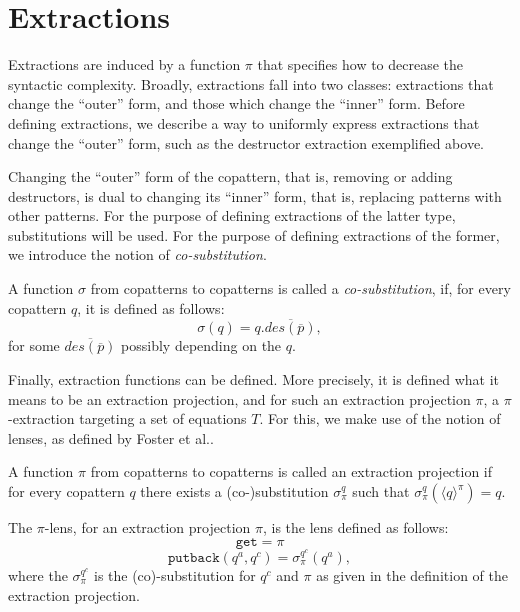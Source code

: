 \section{Extractions}
\label{sec:extrdef}

Extractions are induced by a function $\pi$ that specifies how to decrease the syntactic complexity. Broadly, extractions fall into two classes: extractions that change the ``outer'' form, and those which change the ``inner'' form. Before defining extractions, we describe a way to uniformly express extractions that change the ``outer'' form, such as the destructor extraction exemplified above.

Changing the ``outer'' form of the copattern, that is, removing or adding destructors, is dual to changing its ``inner'' form, that is, replacing patterns with other patterns. For the purpose of defining extractions of the latter type, substitutions will be used. For the purpose of defining extractions of the former, we introduce the notion of \textit{co-substitution}.

\begin{definition}[Co-substitution]
A function $\sigma$ from copatterns to copatterns is called a \textit{co-substitution}, if, for every copattern $q$, it is defined as follows:
\[
\sigma(q) = q.\overline{des(\overline{p})},
\]
for some $\overline{des(\overline{p})}$ possibly depending on the $q$.
\end{definition}

Finally, extraction functions can be defined. More precisely, it is defined what it means to be an extraction projection, and for such an extraction projection $\pi$, a $\pi$-extraction targeting a set of equations $T$. For this, we make use of the notion of lenses, as defined by Foster et al.\cite{foster05combinators}.

\begin{definition}
\label{def:extrproj}
A function $\pi$ from copatterns to copatterns is called an extraction projection if for every copattern $q$ there exists a (co-)substitution $\sigma^q_\pi$ such that $\sigma^q_\pi(\langle q \rangle^\pi) = q$.
\end{definition}

\begin{definition}[$\pi$-lens]
The $\pi$-lens, for an extraction projection $\pi$, is the lens defined as follows:
\[
\mathtt{get} = \pi
\]
\[
\mathtt{putback}(q^a, q^c) = \sigma^{q^c}_\pi(q^a),
\]
where the $\sigma^{q^c}_\pi$ is the (co)-substitution for $q^c$ and $\pi$ as given in the definition of the extraction projection.
\end{definition}

